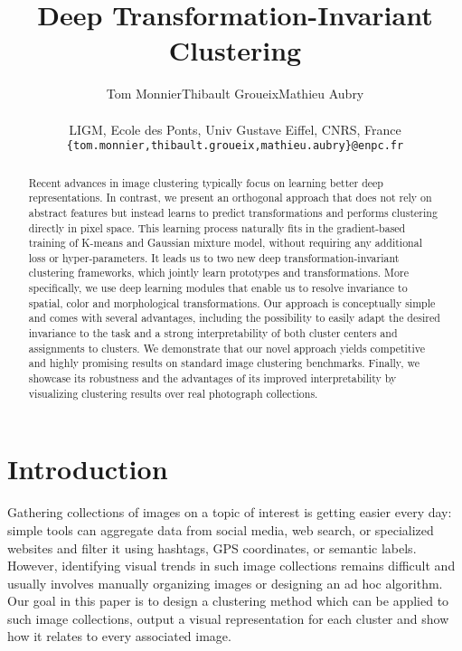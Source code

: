 \documentclass{article}
\title{Deep Transformation-Invariant Clustering}
\author{Tom Monnier\qquad\qquad Thibault Groueix\qquad\qquad Mathieu Aubry\\\\
  LIGM, Ecole des Ponts, Univ Gustave Eiffel, CNRS, France\\
  \texttt{\{tom.monnier,thibault.groueix,mathieu.aubry\}@enpc.fr} \\
}
\begin{document}
\maketitle

\begin{abstract}
  Recent advances in image clustering typically focus on learning better deep 
  representations. In contrast, we present an orthogonal approach that does not rely on 
  abstract features but instead learns to predict transformations and performs clustering 
  directly in pixel space. This learning process naturally fits in the gradient-based 
  training of K-means and Gaussian mixture model, without requiring any additional loss or 
  hyper-parameters. It leads us to two new deep transformation-invariant clustering 
  frameworks, which jointly learn prototypes and transformations. More specifically, we use 
  deep learning modules that enable us to resolve invariance to spatial, color and 
  morphological transformations. Our approach is conceptually simple and comes with several 
  advantages, including the possibility to easily adapt the desired invariance to the task 
  and a strong interpretability of both cluster centers and assignments to clusters.  We 
  demonstrate that our novel approach yields competitive and highly promising results on 
  standard image clustering benchmarks. Finally, we showcase its robustness and the 
  advantages of its improved interpretability by visualizing clustering results over real 
  photograph collections.
\end{abstract}

\section{Introduction}

Gathering collections of images on a topic of interest is getting easier every day: simple 
tools can aggregate data from social media, web search, or specialized websites and filter it 
using hashtags, GPS coordinates, or semantic labels. However, identifying visual trends in 
such image collections remains difficult and usually involves manually organizing images or 
designing an ad hoc algorithm.  Our goal in this paper is to design a clustering method which 
can be applied to such image collections, output a visual representation for each cluster and 
show how it relates to every associated image.
\end{document}

